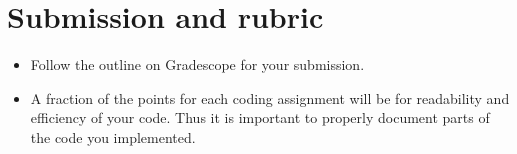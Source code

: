 \documentclass[10pt,letterpaper]{article}
\begin{document}
\section{Submission and rubric}

\begin{itemize}
\item Follow the outline on Gradescope for your submission. 
\item A fraction of the points for each coding assignment will be for
  readability and efficiency of your code. Thus it is important to
  properly document parts of the code you implemented.
\end{itemize}
\end{document}
